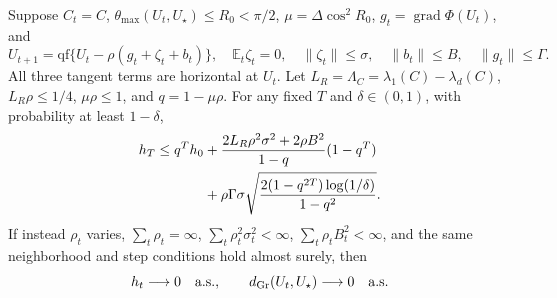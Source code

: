 \begin{theorem}
\label{thm:tracking-probability}
Suppose $C_t=C$, $\theta_{\max}(U_t,U_\star)\le R_0<\pi/2$,
$\mu=\Delta\cos^2R_0$, $g_t=\operatorname{grad}\Phi(U_t)$, and
\begin{equation}
 U_{t+1}=\mathrm{qf}\{U_t-\rho(g_t+\zeta_t+b_t)\},\quad
 \mathbb E_t\zeta_t=0,\quad\|\zeta_t\|\le\sigma,\quad
 \|b_t\|\le B,\quad\|g_t\|\le\Gamma.
\end{equation}
All three tangent terms are horizontal at $U_t$. Let
$L_R=\Lambda_C=\lambda_1(C)-\lambda_d(C)$,
$L_R\rho\le1/4$, $\mu\rho\le1$, and $q=1-\mu\rho$.
For any fixed $T$ and $\delta\in(0,1)$, with probability at least $1-\delta$,
\begin{align}
 h_T\le q^Th_0
 &+\frac{2L_R\rho^2\sigma^2+2\rho B^2}{1-q}(1-q^T)\notag\\
 &+\rho\Gamma\sigma
 \sqrt{\frac{2(1-q^{2T})\log(1/\delta)}{1-q^2}}.\label{eq:tracking-highprob}
\end{align}
If instead $\rho_t$ varies, $\sum_t\rho_t=\infty$,
$\sum_t\rho_t^2\sigma_t^2<\infty$,
$\sum_t\rho_t B_t^2<\infty$, and the same neighborhood and step
conditions hold almost surely, then
\begin{equation}
 h_t\longrightarrow0\quad\text{a.s.},\qquad
 d_{\rm Gr}(U_t,U_\star)\longrightarrow0\quad\text{a.s.}\label{eq:tracking-as}
\end{equation}
\end{theorem}
